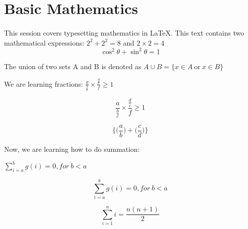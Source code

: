 \documentclass{article}
\begin{document}
	\section{Basic Mathematics}
	\paragraph{}
	This session covers typesetting mathematics in \LaTeX. This text contains two mathematical expressions: $2^{2}+2^{2}=8$ and $2 \times 2=4$\[ \cos^{2}\theta+\sin^{2}\theta=1\]
	
	The union of two sets A and B is denoted as $A\cup B=\{x \in A\ \text{or}\ x \in B\}$
	
	We are learning fractions: $\frac{a}{\frac{b}{c}} \times \frac{\frac{d}{e}}{f} \geq 1$
	
	\[\frac{a}{\frac{b}{c}} \times \frac{\frac{d}{e}}{f} \geq 1\]
	
	\[\Bigg\{\bigg(\frac{a}{b}\bigg) + \bigg(\frac{c}{d}\bigg)\Bigg\}\]
	
	Now, we are learning how to do summation:
	
	$\sum_{i=a}^{b}g(i)=0, for\ b<a$ %
	
	\[\sum_{i=a}^{b}g(i)=0, for\ b<a\] %
	
	\[\sum_{i=1}^{n} i=\frac{n(n+1)}{2}\]
\end{document}
